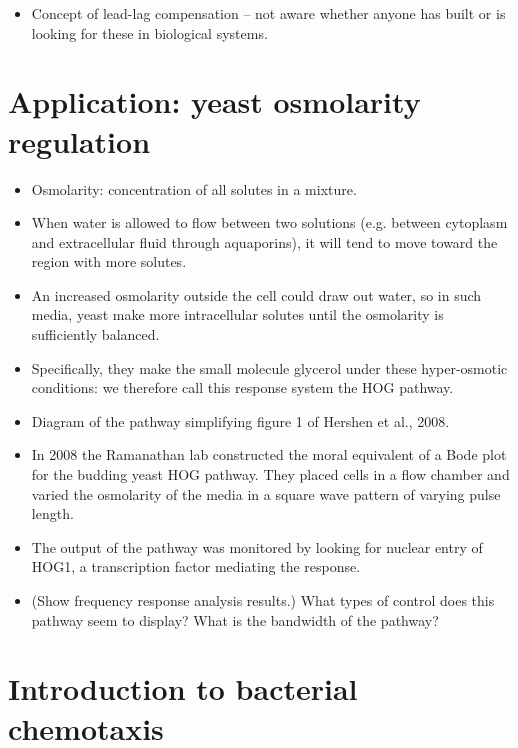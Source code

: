 \documentclass{article}
\begin{document}
\begin{itemize}
\item Concept of lead-lag compensation -- not aware whether anyone has built or is looking for these in biological systems.

\end{itemize}

\section*{Application: yeast osmolarity regulation}
\begin{itemize}
\item Osmolarity: concentration of all solutes in a mixture.
\item When water is allowed to flow between two solutions (e.g. between cytoplasm and extracellular fluid through aquaporins), it will tend to move toward the region with more solutes.
\item An increased osmolarity outside the cell could draw out water, so in such media, yeast make more intracellular solutes until the osmolarity is sufficiently balanced.
\item Specifically, they make the small molecule glycerol under these hyper-osmotic conditions: we therefore call this response system the HOG pathway.
\item Diagram of the pathway simplifying figure 1 of Hershen et al., 2008.
\item In 2008 the Ramanathan lab constructed the moral equivalent of a Bode plot for the budding yeast HOG pathway.  They placed cells in a flow chamber and varied the osmolarity of the media in a square wave pattern of varying pulse length.
\item The output of the pathway was monitored by looking for nuclear entry of HOG1, a transcription factor mediating the response.
\item (Show frequency response analysis results.) What types of control does this pathway seem to display? What is the bandwidth of the pathway? 
\end{itemize}


\section*{Introduction to bacterial chemotaxis}
\end{document}
